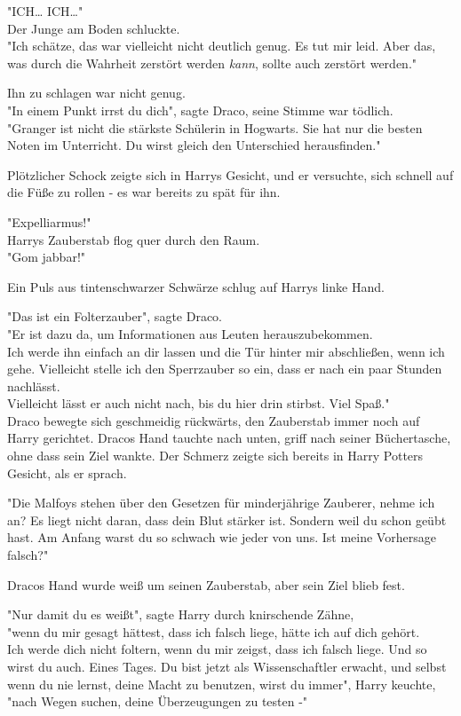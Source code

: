 {"ICH… ICH…"\\ Der Junge am Boden schluckte.\\ "Ich schätze, das war vielleicht nicht deutlich genug. Es tut mir leid. Aber das, was durch die Wahrheit zerstört werden \emph{kann}, sollte auch zerstört werden."

Ihn zu schlagen war nicht genug.\\ "In einem Punkt irrst du dich", sagte Draco, seine Stimme war tödlich.\\ "Granger ist nicht die stärkste Schülerin in Hogwarts. Sie hat nur die besten Noten im Unterricht. Du wirst gleich den Unterschied herausfinden."

Plötzlicher Schock zeigte sich in Harrys Gesicht, und er versuchte, sich schnell auf die Füße zu rollen - es war bereits zu spät für ihn.

"Expelliarmus!"\\ Harrys Zauberstab flog quer durch den Raum.\\ "Gom jabbar!"

Ein Puls aus tintenschwarzer Schwärze schlug auf Harrys linke Hand.

"Das ist ein Folterzauber", sagte Draco.\\ "Er ist dazu da, um Informationen aus Leuten herauszubekommen.\\ Ich werde ihn einfach an dir lassen und die Tür hinter mir abschließen, wenn ich gehe. Vielleicht stelle ich den Sperrzauber so ein, dass er nach ein paar Stunden nachlässt.\\ Vielleicht lässt er auch nicht nach, bis du hier drin stirbst. Viel Spaß."\\ Draco bewegte sich geschmeidig rückwärts, den Zauberstab immer noch auf Harry gerichtet. Dracos Hand tauchte nach unten, griff nach seiner Büchertasche, ohne dass sein Ziel wankte. Der Schmerz zeigte sich bereits in Harry Potters Gesicht, als er sprach.

"Die Malfoys stehen über den Gesetzen für minderjährige Zauberer, nehme ich an? Es liegt nicht daran, dass dein Blut stärker ist. Sondern weil du schon geübt hast. Am Anfang warst du so schwach wie jeder von uns. Ist meine Vorhersage falsch?"

Dracos Hand wurde weiß um seinen Zauberstab, aber sein Ziel blieb fest.

"Nur damit du es weißt", sagte Harry durch knirschende Zähne,\\ "wenn du mir gesagt hättest, dass ich falsch liege, hätte ich auf dich gehört.\\ Ich werde dich nicht foltern, wenn du mir zeigst, dass ich falsch liege. Und so wirst du auch. Eines Tages. Du bist jetzt als Wissenschaftler erwacht, und selbst wenn du nie lernst, deine Macht zu benutzen, wirst du immer", Harry keuchte,\\ "nach Wegen suchen, deine Überzeugungen zu testen -"

}
